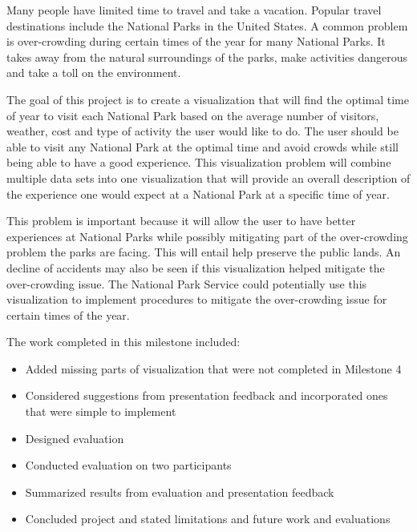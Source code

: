 Many people have limited time to travel and take a vacation. Popular travel destinations include the National Parks in the United States. A common problem is over-crowding during certain times of the year for many National Parks. It takes away from the natural surroundings of the parks, make activities dangerous and take a toll on the environment.

The goal of this project is to create a visualization that will find the optimal time of year to visit each National Park based on the average number of visitors, weather, cost and type of activity the user would like to do. The user should be able to visit any National Park at the optimal time and avoid crowds while still being able to have a good experience. This visualization problem will combine multiple data sets into one visualization that will provide an overall description of the experience one would expect at a National Park at a specific time of year.

This problem is important because it will allow the user to have better experiences at National Parks while possibly mitigating part of the over-crowding problem the parks are facing. This will entail help preserve the public lands. An decline of accidents may also be seen if this visualization helped mitigate the over-crowding issue. The National Park Service could potentially use this visualization to implement procedures to mitigate the over-crowding issue for certain times of the year. 

The work completed in this milestone included:
\begin{itemize}
  \item Added missing parts of visualization that were not completed in Milestone 4
  \item Considered suggestions from presentation feedback and incorporated ones that were simple to implement
  \item Designed evaluation
  \item Conducted evaluation on two participants
  \item Summarized results from evaluation and presentation feedback
  \item Concluded project and stated limitations and future work and evaluations
\end{itemize}